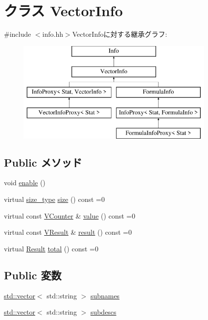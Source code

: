 \hypertarget{classStats_1_1VectorInfo}{
\section{クラス VectorInfo}
\label{classStats_1_1VectorInfo}
}


{\ttfamily \#include $<$info.hh$>$}VectorInfoに対する継承グラフ:\begin{figure}[H]
\begin{center}
\leavevmode
\includegraphics[height=5cm]{classStats_1_1VectorInfo}
\end{center}
\end{figure}
\subsection*{Public メソッド}
\begin{DoxyCompactItemize}
\item 
void \hyperlink{classStats_1_1VectorInfo_a486f22824bd83c5308a0d70ffac6f758}{enable} ()
\item 
virtual \hyperlink{namespaceStats_ada51e68d31936547d3729c82daf6b7c6}{size\_\-type} \hyperlink{classStats_1_1VectorInfo_a4051d143efd31726fa13df03ae4e1bce}{size} () const =0
\item 
virtual const \hyperlink{classstd_1_1vector}{VCounter} \& \hyperlink{classStats_1_1VectorInfo_a23b21bb9bfe7e45c824c7607a1c301fc}{value} () const =0
\item 
virtual const \hyperlink{classstd_1_1vector}{VResult} \& \hyperlink{classStats_1_1VectorInfo_a7fcf57115122663db42f39cc18ca0f62}{result} () const =0
\item 
virtual \hyperlink{namespaceStats_ad874d2cfd4b4a29ebd480bb2e67f20ae}{Result} \hyperlink{classStats_1_1VectorInfo_ab152b7e89b37a7db03b04d500ceb8349}{total} () const =0
\end{DoxyCompactItemize}
\subsection*{Public 変数}
\begin{DoxyCompactItemize}
\item 
\hyperlink{classstd_1_1vector}{std::vector}$<$ std::string $>$ \hyperlink{classStats_1_1VectorInfo_a3b95ca426d97cab365cc623926fdd294}{subnames}
\item 
\hyperlink{classstd_1_1vector}{std::vector}$<$ std::string $>$ \hyperlink{classStats_1_1VectorInfo_a722488efce925fb896e4111f77731f25}{subdescs}
\end{DoxyCompactItemize}


